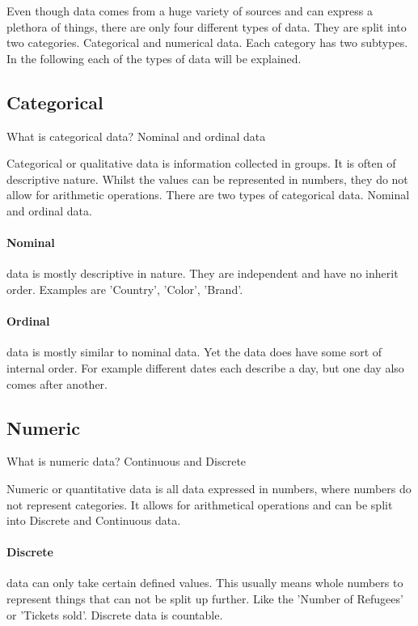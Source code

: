 Even though data comes from a huge variety of sources and can express a plethora of things, there are only four different types of data. They are split into two categories. Categorical and numerical data. Each category has two subtypes. In the following each of the types of data will be explained.

\subsection{Categorical}
What is categorical data? Nominal and ordinal data

Categorical or qualitative data is information collected in groups. It is often of descriptive nature. Whilst the values can be represented in numbers, they do not allow for arithmetic operations.
There are two types of categorical data. Nominal and ordinal data.

\paragraph{Nominal}
data is mostly descriptive in nature. They are independent and have no inherit order. Examples are 'Country', 'Color', 'Brand'.

\paragraph{Ordinal}
data is mostly similar to nominal data. Yet the data does have some sort of internal order. For example different dates each describe a day, but one day also comes after another.

\subsection{Numeric}
What is numeric data? Continuous and Discrete

Numeric or quantitative data is all data expressed in numbers, where numbers do not represent categories. It allows for arithmetical operations and can be split into Discrete and Continuous data.

\paragraph{Discrete}
data can only take certain defined values. This usually means whole numbers to represent things that can not be split up further. Like the 'Number of Refugees' or 'Tickets sold'. Discrete data is countable.

